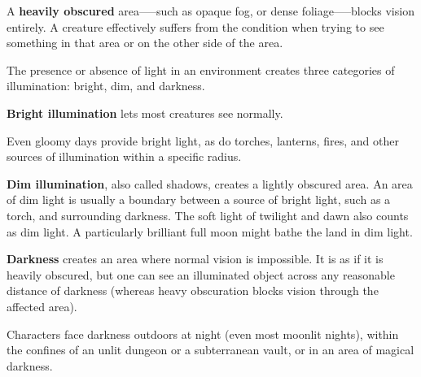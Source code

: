 A \textbf{heavily obscured} area—--such as opaque fog, or dense foliage—--blocks vision entirely. A creature effectively suffers from the  condition when trying to see something in that area or on the other side of the area.

The presence or absence of light in an environment creates three categories of illumination: bright, dim, and darkness.

\textbf{Bright illumination} lets most creatures see normally.

Even gloomy days provide bright light, as do torches, lanterns, fires, and other sources of illumination within a specific radius.

\textbf{Dim illumination}, also called shadows, creates a lightly obscured area. An area of dim light is usually a boundary between a source of bright light, such as a torch, and surrounding darkness. The soft light of twilight and dawn also counts as dim light. A particularly brilliant full moon might bathe the land in dim light.

\textbf{Darkness} creates an area where normal vision is impossible. It is as if it is heavily obscured, but one can see an illuminated object across any reasonable distance of darkness (whereas heavy obscuration blocks vision through the affected area).

Characters face darkness outdoors at night (even most moonlit nights), within the confines of an unlit dungeon or a subterranean vault, or in an area of magical darkness.

